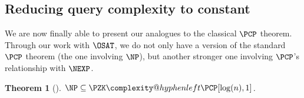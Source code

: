 \documentclass[english,12pt]{reedthesis}
\makeatletter
\theoremstyle{plain}
\newtheorem{thm}{Theorem}[section]
\theoremstyle{definition}
\theoremstyle{remark}
\newcommand{\PZKPCP}{%
  \PZK\complexity@hyphenleft\PCP
}
\makeatother
\begin{document}
\subsection{Reducing query complexity to constant}\label{sec:constant-pcp-np}

We are now finally able to present our analogues to the classical $\PCP$
theorem. Through our work with $\OSAT$, we do not only have a version of the
standard $\PCP$ theorem (the one involving $\NP$), but another stronger one
involving $\PCP$'s relationship with $\NEXP$.

\begin{thm}[{\cite[Theorem 2]{GOS25}}]\label{thm:zk-pcp}
  $\NP \subseteq \PZKPCP[\log(n), 1]$.
\end{thm}
\end{document}
